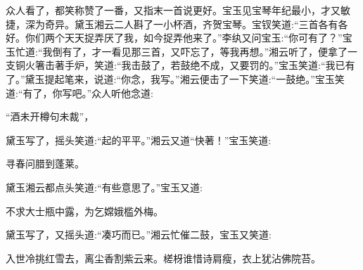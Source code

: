 \begin{parag}
    众人看了，都笑称赞了一番，又指末一首说更好。宝玉见宝琴年纪最小，才又敏捷，深为奇异。黛玉湘云二人斟了一小杯酒，齐贺宝琴。宝钗笑道:“三首各有各好。你们两个天天捉弄厌了我，如今捉弄他来了。”李纨又问宝玉:“你可有了？”宝玉忙道:“我倒有了，才一看见那三首，又吓忘了，等我再想。”湘云听了，便拿了一支铜火箸击著手炉，笑道:“我击鼓了，若鼓绝不成，又要罚的。”宝玉笑道:“我已有了。”黛玉提起笔来，说道:“你念，我写。”湘云便击了一下笑道:“一鼓绝。”宝玉笑道:“有了，你写吧。”众人听他念道:
\end{parag}

\begin{poem}
    \begin{pl}
        “酒未开樽句未裁”，
    \end{pl}
\end{poem}


\begin{parag}
    黛玉写了，摇头笑道:“起的平平。”湘云又道“快著！”宝玉笑道:
\end{parag}


\begin{poem}
    \begin{pl} 寻春问腊到蓬莱。\end{pl}
\end{poem}

\begin{parag}
    黛玉湘云都点头笑道:“有些意思了。”宝玉又道:
\end{parag}


\begin{poem}
    \begin{pl}
        不求大士瓶中露，为乞嫦娥槛外梅。
    \end{pl}
\end{poem}


\begin{parag}
    黛玉写了，又摇头道:“凑巧而已。”湘云忙催二鼓，宝玉又笑道:
\end{parag}


\begin{poem}
    \begin{pl}入世冷挑红雪去，离尘香割紫云来。槎枒谁惜诗肩瘦，衣上犹沾佛院苔。\end{pl}
\end{poem}


